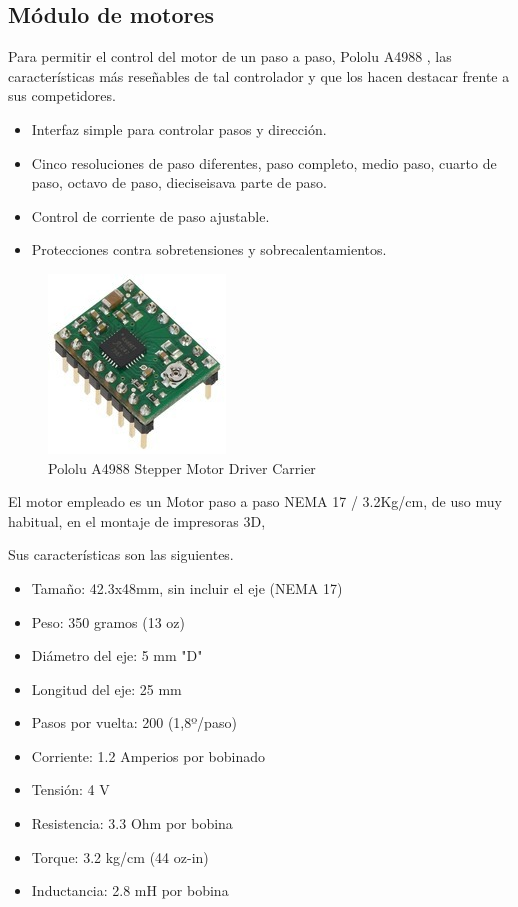 \subsection{Módulo de motores}

Para permitir el control del motor de un paso a paso,  Pololu A4988 \cite{pololu},
las características más reseñables de tal controlador y que los hacen destacar frente a sus competidores.

\begin{itemize}
	\item{} Interfaz simple para controlar pasos y dirección.
	\item{} Cinco resoluciones de paso diferentes, paso completo, medio paso, cuarto de paso, octavo de paso, dieciseisava parte de paso. 
	\item{} Control de corriente de paso ajustable.
	\item{} Protecciones contra sobretensiones y sobrecalentamientos.
\end{itemize}


\begin{figure}[h]
\centering
\includegraphics[width=0.3\linewidth]{../images/pololu}
\caption{Pololu A4988 Stepper Motor Driver Carrier}
\label{fig:pololu}
\end{figure}

\newpage

El motor empleado es un Motor paso a paso NEMA 17 / 3.2Kg/cm, de uso muy habitual, 
en el montaje de impresoras 3D,  

\bigskip
Sus características son las siguientes.

\begin{itemize}
	\item{Tamaño:} 42.3x48mm, sin incluir el eje (NEMA 17)
	\item{Peso:} 350 gramos (13 oz)
	\item{Diámetro del eje:} 5 mm "D"
	\item{Longitud del eje:} 25 mm
	\item{Pasos por vuelta:} 200 (1,8º/paso)
	\item{Corriente:}  1.2 Amperios por bobinado
	\item{Tensión:} 4 V
	\item{Resistencia:} 3.3 Ohm por bobina
	\item{Torque:} 3.2 kg/cm (44 oz-in)
	\item{Inductancia:} 2.8 mH por bobina 
\end{itemize}

